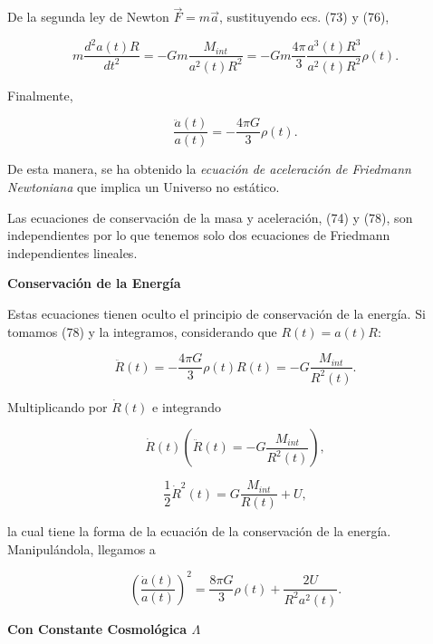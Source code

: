\documentclass{article}
\begin{document}
    De la segunda ley de Newton $\vec{F} = m \vec{a}$, sustituyendo ecs. (73) y (76),
    
    \begin{equation}
        m \frac{d^2 a(t)R}{dt^2} = - Gm \frac{M_{int}}{a^2(t)R^2} = -Gm \frac{4\pi}{3}\frac{a^3(t)R^3}{a^2(t)R^2}\rho(t).
    \end{equation}
    
    Finalmente, 
    
    \begin{equation}
        \boxed{\frac{\ddot{a}(t)}{a(t)} = - \frac{4\pi G}{3}  \rho(t).}
    \end{equation}
    
    De esta manera, se ha obtenido la {\textit{ecuación de aceleración de Friedmann Newtoniana}} que implica un Universo no estático. 
    
    Las ecuaciones de conservación de la masa y aceleración, (74) y (78), son independientes por lo que tenemos solo dos ecuaciones de Friedmann independientes lineales. 
    
    \large{\bf{Conservación de la Energía}}
    
    Estas ecuaciones tienen oculto el principio de conservación de la energía. Si tomamos (78) y la integramos, considerando que $R(t) = a(t) R$: 
    
    \begin{equation}
        \ddot{R}(t) = - \frac{4\pi G}{3} \rho(t) R(t)   = - G \frac{M_{int} }{R^2(t)}.
    \end{equation}
    
    Multiplicando por $\dot{R}(t)$ e integrando 
    
   \[
  \dot{R}(t) \left( \ddot{R}(t) = - G \frac{M_{int} }{R^2(t)} \right),
  \]
    
    
    \begin{equation}
       \frac{1}{2}  \dot{R}^2(t)  = G \frac{M_{int} }{R(t)} + U,
    \end{equation}
    
    la cual tiene la forma de la ecuación de la conservación de la energía. Manipulándola, llegamos a 
    
    \begin{equation}
        \boxed{\left(\frac{\dot{a}(t)}{a(t)} \right)^2 = \frac{8\pi G}{3} \rho(t) + \frac{2U}{R^2 a^2(t)}.}
    \end{equation}
    
    \large{\bf{Con Constante Cosmológica $\Lambda$}}
    
\end{document}
